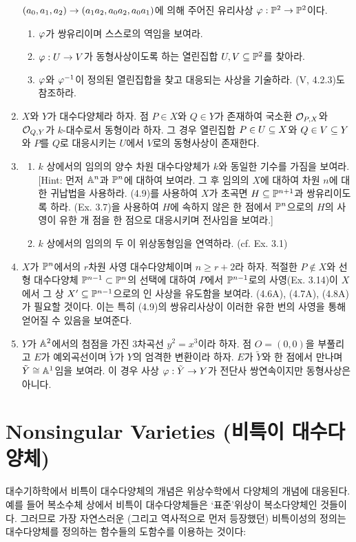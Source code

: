 \begin{enumerate}[label=\tb{4.\arabic*.},itemindent=0mm,itemsep=2mm]
	$(a_0,a_1,a_2)\rightarrow(a_1a_2,a_0a_2,a_0a_1)$에 의해 주어진 유리사상 $\varphi:\mathbb{P}^2\rightarrow\mathbb{P}^2$이다.
	\begin{enumerate}[label=(\alph*)]
	\item $\varphi$가 쌍유리이며 스스로의 역임을 보여라.
	\item $\varphi:U\rightarrow V$가 동형사상이도록 하는 열린집합 $U,V\subseteq\mathbb{P}^2$를 찾아라.
	\item $\varphi$와 $\varphi^{-1}$이 정의된 열린집합을 찾고 대응되는 사상을 기술하라. (V, 4.2.3)도 참조하라.
	\end{enumerate}
	\item $X$와 $Y$가 대수다양체라 하자. 점 $P\in X$와 $Q\in Y$가 존재하여
	국소환 $\mathcal{O}_{P,X}$와 $\mathcal{O}_{Q,Y}$가 $k$-대수로서 동형이라 하자.
	그 경우 열린집합 $P\in U\subseteq X$와 $Q\in V\subseteq Y$와 $P$를 $Q$로 대응시키는 $U$에서 $V$로의 동형사상이 존재한다.
	\item \begin{enumerate}[label=(\alph*)]
	\item $k$ 상에서의 임의의 양수 차원 대수다양체가 $k$와 동일한 기수를 가짐을 보여라.
	[Hint: 먼저 $\mathbb{A}^n$과 $\mathbb{P}^n$에 대하여 보여라. 그 후 임의의 $X$에 대하여 차원 $n$에 대한 귀납법을 사용하라.
	(4.9)를 사용하여 $X$가 초곡면 $H\subseteq\mathbb{P}^{n+1}$과 쌍유리이도록 하라. (Ex. 3.7)을 사용하여
	$H$에 속하지 않은 한 점에서 $\mathbb{P}^n$으로의 $H$의 사영이 유한 개 점을 한 점으로 대응시키며 전사임을 보여라.]
	\item $k$ 상에서의 임의의 두 이 위상동형임을 연역하라. (cf. Ex. 3.1)
	\end{enumerate}
	\item $X$가 $\mathbb{P}^n$에서의 $r$차원 사영 대수다양체이며 $n\ge r+2$라 하자.
	적절한 $P\notin X$와 선형 대수다양체 $\mathbb{P}^{n-1}\subset\mathbb{P}^n$의 선택에 대하여 $P$에서 $\mathbb{P}^{n-1}$로의 사영(Ex. 3.14)이
	$X$에서 그 상 $X'\subseteq\mathbb{P}^{n-1}$으로의 인 사상을 유도함을 보여라.
	(4.6A), (4.7A), (4.8A)가 필요할 것이다. 이는 특히 (4.9)의 쌍유리사상이 이러한 유한 번의 사영을 통해 얻어질 수 있음을 보여준다.
	\item $Y$가 $\mathbb{A}^2$에서의 첨점을 가진 3차곡선 $y^2=x^3$이라 하자.
	점 $O=(0,0)$을 부풀리고 $E$가 예외곡선이며 $\tilde Y$가 $Y$의 엄격한 변환이라 하자.
	$E$가 $\tilde Y$와 한 점에서 만나며 $\tilde Y\cong\mathbb{A}^1$임을 보여라.
	이 경우 사상 $\varphi:\tilde Y\rightarrow Y$가 전단사 쌍연속이지만 동형사상은 아니다.
	\end{enumerate}
	
	
	
	\section{Nonsingular Varieties (비특이 대수다양체)}
	대수기하학에서 비특이 대수다양체의 개념은 위상수학에서 다양체의 개념에 대응된다.
	예를 들어 복소수체 상에서 비특이 대수다양체들은 `표준'위상이 복소다양체인 것들이다.
	그러므로 가장 자연스러운 (그리고 역사적으로 먼저 등장했던) 비특이성의 정의는
	대수다양체를 정의하는 함수들의 도함수를 이용하는 것이다:
	
